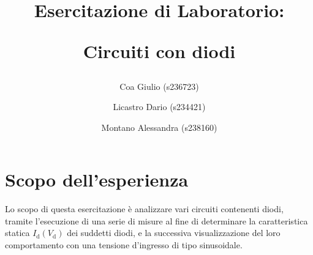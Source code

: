\documentclass[a4paper]{article}
\title{
		\begin{center}
			Esercitazione di Laboratorio:
		\end{center}
		\newline
		\begin{center}
			Circuiti con diodi
		\end{center}
	}
\author{
	Coa Giulio (s236723)
	\and
	Licastro Dario (s234421)
	\and
	Montano Alessandra (s238160)
}
\begin{document}
	\begin{titlingpage}
		\maketitle
	\end{titlingpage}
	\newpage
	\section{Scopo dell'esperienza}
		Lo scopo di questa esercitazione è analizzare vari circuiti contenenti diodi, tramite l’esecuzione di una serie di misure al fine di determinare la caratteristica statica $ I_{\mathrm{d}}(V_{\mathrm{d}}) $ dei suddetti diodi, e la successiva visualizzazione del loro comportamento con una tensione d'ingresso di tipo sinusoidale.
\end{document}
